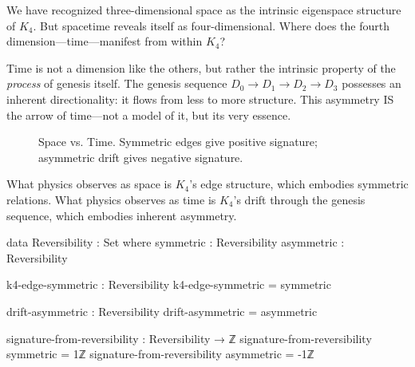 \documentclass[11pt,a4paper]{book}
\begin{document}
We have recognized three-dimensional space as the intrinsic eigenspace structure of $K_4$. But spacetime reveals itself as four-dimensional. Where does the fourth dimension—time—manifest from within $K_4$?

Time is not a dimension like the others, but rather the intrinsic property of the \emph{process} of genesis itself. The genesis sequence $D_0 \to D_1 \to D_2 \to D_3$ possesses an inherent directionality: it flows from less to more structure. This asymmetry IS the arrow of time—not a model of it, but its very essence.

\begin{figure}[h]
\centering
{}
\caption{Space vs. Time. Symmetric edges give positive signature; asymmetric drift gives negative signature.}
\label{fig:time-emergence}
\end{figure}

What physics observes as space is $K_4$'s edge structure, which embodies symmetric relations. What physics observes as time is $K_4$'s drift through the genesis sequence, which embodies inherent asymmetry.

\begin{code}
data Reversibility : Set where
  symmetric  : Reversibility
  asymmetric : Reversibility

k4-edge-symmetric : Reversibility
k4-edge-symmetric = symmetric

drift-asymmetric : Reversibility
drift-asymmetric = asymmetric

signature-from-reversibility : Reversibility → ℤ
signature-from-reversibility symmetric  = 1ℤ
signature-from-reversibility asymmetric = -1ℤ
\end{code}
\end{document}
